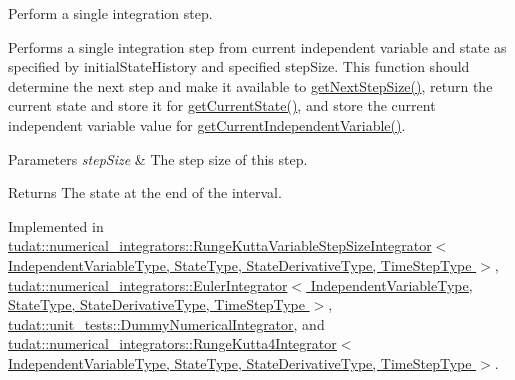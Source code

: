 Perform a single integration step. 

Performs a single integration step from current independent variable and state as specified by initial\+State\+History and specified step\+Size. This function should determine the next step and make it available to \hyperlink{classtudat_1_1numerical__integrators_1_1NumericalIntegrator_ab8b38ad002b10d53adf7b2c2282a86cc}{get\+Next\+Step\+Size()}, return the current state and store it for \hyperlink{classtudat_1_1numerical__integrators_1_1NumericalIntegrator_a90b09d8d6a9b07d495bfabe9122748a1}{get\+Current\+State()}, and store the current independent variable value for \hyperlink{classtudat_1_1numerical__integrators_1_1NumericalIntegrator_a8ca318a39081842472ccd1a165ec06a4}{get\+Current\+Independent\+Variable()}. 
\begin{DoxyParams}{Parameters}
{\em step\+Size} & The step size of this step. \\
\hline
\end{DoxyParams}
\begin{DoxyReturn}{Returns}
The state at the end of the interval. 
\end{DoxyReturn}


Implemented in \hyperlink{classtudat_1_1numerical__integrators_1_1RungeKuttaVariableStepSizeIntegrator_a34e884253297c9bfb17d756c36510cc4}{tudat\+::numerical\+\_\+integrators\+::\+Runge\+Kutta\+Variable\+Step\+Size\+Integrator$<$ Independent\+Variable\+Type, State\+Type, State\+Derivative\+Type, Time\+Step\+Type $>$}, \hyperlink{classtudat_1_1numerical__integrators_1_1EulerIntegrator_a6ff2ab6fbde6cb97cfe77961963e4910}{tudat\+::numerical\+\_\+integrators\+::\+Euler\+Integrator$<$ Independent\+Variable\+Type, State\+Type, State\+Derivative\+Type, Time\+Step\+Type $>$}, \hyperlink{classtudat_1_1unit__tests_1_1DummyNumericalIntegrator_aa000aed365de1583a25fd8be85497081}{tudat\+::unit\+\_\+tests\+::\+Dummy\+Numerical\+Integrator}, and \hyperlink{classtudat_1_1numerical__integrators_1_1RungeKutta4Integrator_abaa09d78b7b023d900cecb8fcbdcdca6}{tudat\+::numerical\+\_\+integrators\+::\+Runge\+Kutta4\+Integrator$<$ Independent\+Variable\+Type, State\+Type, State\+Derivative\+Type, Time\+Step\+Type $>$}.

